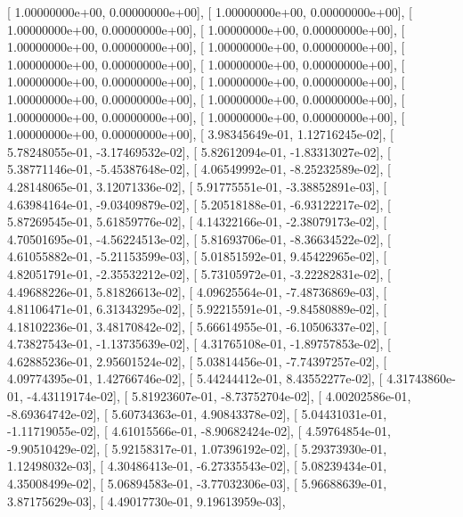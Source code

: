 \documentclass{article}
\begin{document}
       [  1.00000000e+00,   0.00000000e+00],
       [  1.00000000e+00,   0.00000000e+00],
       [  1.00000000e+00,   0.00000000e+00],
       [  1.00000000e+00,   0.00000000e+00],
       [  1.00000000e+00,   0.00000000e+00],
       [  1.00000000e+00,   0.00000000e+00],
       [  1.00000000e+00,   0.00000000e+00],
       [  1.00000000e+00,   0.00000000e+00],
       [  1.00000000e+00,   0.00000000e+00],
       [  1.00000000e+00,   0.00000000e+00],
       [  1.00000000e+00,   0.00000000e+00],
       [  1.00000000e+00,   0.00000000e+00],
       [  1.00000000e+00,   0.00000000e+00],
       [  1.00000000e+00,   0.00000000e+00],
       [  1.00000000e+00,   0.00000000e+00],
       [  3.98345649e-01,   1.12716245e-02],
       [  5.78248055e-01,  -3.17469532e-02],
       [  5.82612094e-01,  -1.83313027e-02],
       [  5.38771146e-01,  -5.45387648e-02],
       [  4.06549992e-01,  -8.25232589e-02],
       [  4.28148065e-01,   3.12071336e-02],
       [  5.91775551e-01,  -3.38852891e-03],
       [  4.63984164e-01,  -9.03409879e-02],
       [  5.20518188e-01,  -6.93122217e-02],
       [  5.87269545e-01,   5.61859776e-02],
       [  4.14322166e-01,  -2.38079173e-02],
       [  4.70501695e-01,  -4.56224513e-02],
       [  5.81693706e-01,  -8.36634522e-02],
       [  4.61055882e-01,  -5.21153599e-03],
       [  5.01851592e-01,   9.45422965e-02],
       [  4.82051791e-01,  -2.35532212e-02],
       [  5.73105972e-01,  -3.22282831e-02],
       [  4.49688226e-01,   5.81826613e-02],
       [  4.09625564e-01,  -7.48736869e-03],
       [  4.81106471e-01,   6.31343295e-02],
       [  5.92215591e-01,  -9.84580889e-02],
       [  4.18102236e-01,   3.48170842e-02],
       [  5.66614955e-01,  -6.10506337e-02],
       [  4.73827543e-01,  -1.13735639e-02],
       [  4.31765108e-01,  -1.89757853e-02],
       [  4.62885236e-01,   2.95601524e-02],
       [  5.03814456e-01,  -7.74397257e-02],
       [  4.09774395e-01,   1.42766746e-02],
       [  5.44244412e-01,   8.43552277e-02],
       [  4.31743860e-01,  -4.43119174e-02],
       [  5.81923607e-01,  -8.73752704e-02],
       [  4.00202586e-01,  -8.69364742e-02],
       [  5.60734363e-01,   4.90843378e-02],
       [  5.04431031e-01,  -1.11719055e-02],
       [  4.61015566e-01,  -8.90682424e-02],
       [  4.59764854e-01,  -9.90510429e-02],
       [  5.92158317e-01,   1.07396192e-02],
       [  5.29373930e-01,   1.12498032e-03],
       [  4.30486413e-01,  -6.27335543e-02],
       [  5.08239434e-01,   4.35008499e-02],
       [  5.06894583e-01,  -3.77032306e-03],
       [  5.96688639e-01,   3.87175629e-03],
       [  4.49017730e-01,   9.19613959e-03],
\end{document}
